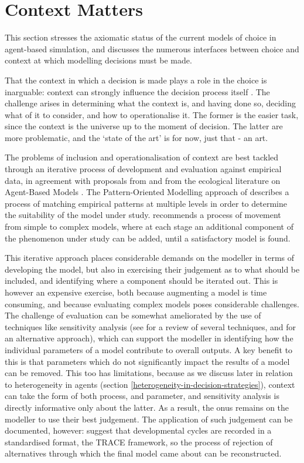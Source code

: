 \documentclass{article}
\begin{document}
\section{Context Matters}
\label{sec:context_matters}

This section stresses the axiomatic status of the current models of choice in agent-based simulation, and discusses the numerous interfaces between choice and context at which modelling decisions must be made.

That the context in which a decision is made plays a role in the choice is inarguable: context can strongly influence the decision process itself \citep{Ben-Akiva2012}. The challenge arises in determining what the context is, and having done so, deciding what of it to consider, and how to operationalise it. The former is the easier task, since the context is the universe up to the moment of decision. The latter are more problematic, and the `state of the art' is for now, just that - an art. 

The problems of inclusion and operationalisation of context are best tackled through an iterative process of development and evaluation against empirical data, in agreement with proposals from \cite{Cioffi-Revilla2010} and from the ecological literature on Agent-Based Models \citep{Grimm2005, Schmolke2010}. The Pattern-Oriented Modelling approach of \cite{Grimm2005} describes a process of matching empirical patterns at multiple levels in order to determine the suitability of the model under study. \cite{Cioffi-Revilla2010} recommends a process of movement from simple to complex models, where at each stage an additional component of the phenomenon under study can be added, until a satisfactory model is found. 

This iterative approach places considerable demands on the modeller in terms of developing the model, but also in exercising their judgement as to what should be included, and identifying where a component should be iterated out. This is however an expensive exercise, both because augmenting a model is time consuming, and because evaluating complex models poses considerable challenges. The challenge of evaluation can be somewhat ameliorated by the use of techniques like sensitivity analysis (see \citet{Thiele2014} for a review of several techniques, and \citet{Oakley2004} for an alternative approach), which can support the modeller in identifying how the individual parameters of a model contribute to overall outputs. A key benefit to this is that parameters which do not significantly impact the results of a model can be removed. This too has limitations, because as we discuss later in relation to heterogeneity in agents (section \ref{heterogeneity-in-decision-strategies}), context can take the form of both process, and parameter, and sensitivity analysis is directly informative only about the latter.
As a result, the onus remains on the modeller to use their best judgement. The application of such judgement can be documented, however: \cite{Schmolke2010} suggest that developmental cycles are recorded in a standardised format, the TRACE framework, so the process of rejection of alternatives through which the final model came about can be reconstructed.
\end{document}
